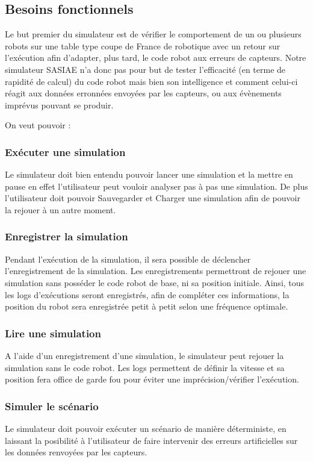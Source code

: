 
\subsection{Besoins fonctionnels}

Le but premier du simulateur est de vérifier le comportement de un ou plusieurs robots sur une table type coupe de France de robotique avec un retour sur l'exécution afin d'adapter, plus tard, le code robot aux erreurs de capteurs. Notre simulateur SASIAE n'a donc pas pour but de tester l'efficacité
(en terme de rapidité de calcul)
du code robot mais bien 
son intelligence et
comment celui-ci réagit aux données erronnées envoyées par les capteurs, ou aux évènements imprévus pouvant se produir.

On veut pouvoir :
\subsubsection{Exécuter une simulation}
Le simulateur doit bien entendu pouvoir lancer une simulation et la mettre en pause en effet l'utilisateur peut vouloir analyser pas à pas une simulation. De plus l'utilisateur doit pouvoir Sauvegarder et Charger une simulation afin de pouvoir la rejouer à un autre moment.

\subsubsection{Enregistrer la simulation}
Pendant l'exécution de la simulation, il sera possible de déclencher l'enregistrement de la simulation. Les enregistrements permettront de rejouer une simulation sans posséder le code robot de base, ni sa position initiale. Ainsi, tous les logs d'exécutions seront enregistrés, afin de compléter ces informations, la position du robot sera enregistrée petit à petit selon une fréquence optimale.

\subsubsection{Lire une simulation}
A l'aide d'un enregistrement d'une simulation, le simulateur peut rejouer la simulation sans le code robot. Les logs permettent de définir la vitesse et sa position fera office de garde fou pour éviter une imprécision/vérifier l'exécution.

\subsubsection{Simuler le scénario}
Le simulateur doit pouvoir exécuter un scénario de manière déterministe, en laissant la posibilité à l'utilisateur de faire intervenir des erreurs artificielles sur les données renvoyées par les capteurs.

